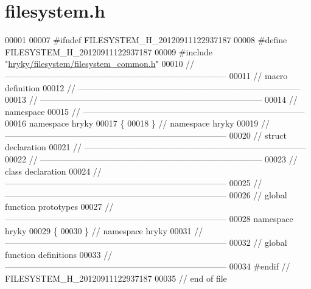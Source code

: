 \hypertarget{filesystem_8h_source}{\section{filesystem.\-h}
}

\begin{DoxyCode}
00001 
00007 \textcolor{preprocessor}{#ifndef FILESYSTEM\_H\_20120911122937187}
00008 \textcolor{preprocessor}{}\textcolor{preprocessor}{#define FILESYSTEM\_H\_20120911122937187}
00009 \textcolor{preprocessor}{}\textcolor{preprocessor}{#include "\hyperlink{filesystem__common_8h}{hryky/filesystem/filesystem_common.h}"}
00010 \textcolor{comment}{//
      ------------------------------------------------------------------------------}
00011 \textcolor{comment}{// macro definition}
00012 \textcolor{comment}{//
      ------------------------------------------------------------------------------}
00013 \textcolor{comment}{//
      ------------------------------------------------------------------------------}
00014 \textcolor{comment}{// namespace}
00015 \textcolor{comment}{//
      ------------------------------------------------------------------------------}
00016 \textcolor{keyword}{namespace }hryky
00017 \{
00018 \} \textcolor{comment}{// namespace hryky}
00019 \textcolor{comment}{//
      ------------------------------------------------------------------------------}
00020 \textcolor{comment}{// struct declaration}
00021 \textcolor{comment}{//
      ------------------------------------------------------------------------------}
00022 \textcolor{comment}{//
      ------------------------------------------------------------------------------}
00023 \textcolor{comment}{// class declaration}
00024 \textcolor{comment}{//
      ------------------------------------------------------------------------------}
00025 \textcolor{comment}{//
      ------------------------------------------------------------------------------}
00026 \textcolor{comment}{// global function prototypes}
00027 \textcolor{comment}{//
      ------------------------------------------------------------------------------}
00028 \textcolor{keyword}{namespace }hryky
00029 \{
00030 \} \textcolor{comment}{// namespace hryky}
00031 \textcolor{comment}{//
      ------------------------------------------------------------------------------}
00032 \textcolor{comment}{// global function definitions}
00033 \textcolor{comment}{//
      ------------------------------------------------------------------------------}
00034 \textcolor{preprocessor}{#endif // FILESYSTEM\_H\_20120911122937187}
00035 \textcolor{preprocessor}{}\textcolor{comment}{// end of file}
\end{DoxyCode}
